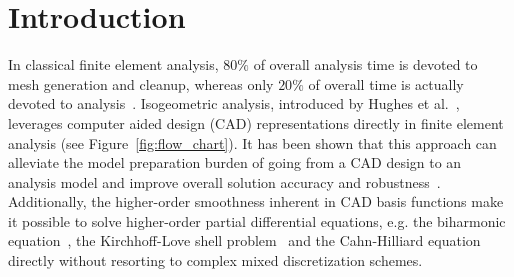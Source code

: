 \chapter{Introduction}
\label{chp:chapter1}
\graphicspath{{figures/}{figures/chapter1/}}

In classical finite element analysis, $80\%$ of overall analysis time is devoted to mesh generation and cleanup, whereas only $20\%$ of overall time is actually devoted to analysis~\cite{cottrell2009isogeometric}. Isogeometric analysis, introduced by Hughes et al.~\cite{HUGHES20054135}, leverages computer aided design (CAD) representations directly in finite element analysis (see Figure~\ref{fig:flow_chart}). It has been shown that this approach can alleviate the model preparation burden of going from a CAD design to an analysis model and improve overall solution accuracy and robustness~\cite{bazilevs2006isogeometric, da2011some, da2014mathematical}. Additionally, the higher-order smoothness inherent in CAD basis functions make it possible to solve higher-order partial differential equations, e.g. the biharmonic equation~\cite{kapl_isogeometric_2015, kapl_isogeometric_2017}, the Kirchhoff-Love shell problem~\cite{kiendl2009isogeometric, kiendl2010bending, kiendl2015isogeometric} and the Cahn-Hilliard equation~\cite{gomez2008isogeometric, borden2014higher} directly without resorting to complex mixed discretization schemes.\par

